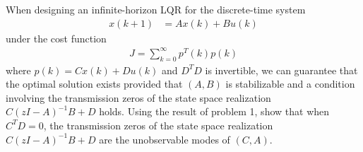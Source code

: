 \item
When designing an infinite-horizon LQR for the discrete-time system
\begin{align*}
    x(k+1) & = Ax(k) + Bu(k)
\end{align*}
under the cost function
\begin{align*}
    J = \sum_{k=0}^\infty p^T(k) p(k)
\end{align*}
where $p(k) = Cx(k) + Du(k)$ and $D^T D$ is invertible, we can guarantee that the optimal solution exists provided that $(A,B)$ is stabilizable and a condition involving the transmission zeros of the state space realization $C (zI-A)^{-1} B + D$ holds. Using the result of problem 1, show that when $C^T D = 0$, the transmission zeros of the state space realization $C (zI-A)^{-1} B + D$ are the unobservable modes of $(C,A)$. 